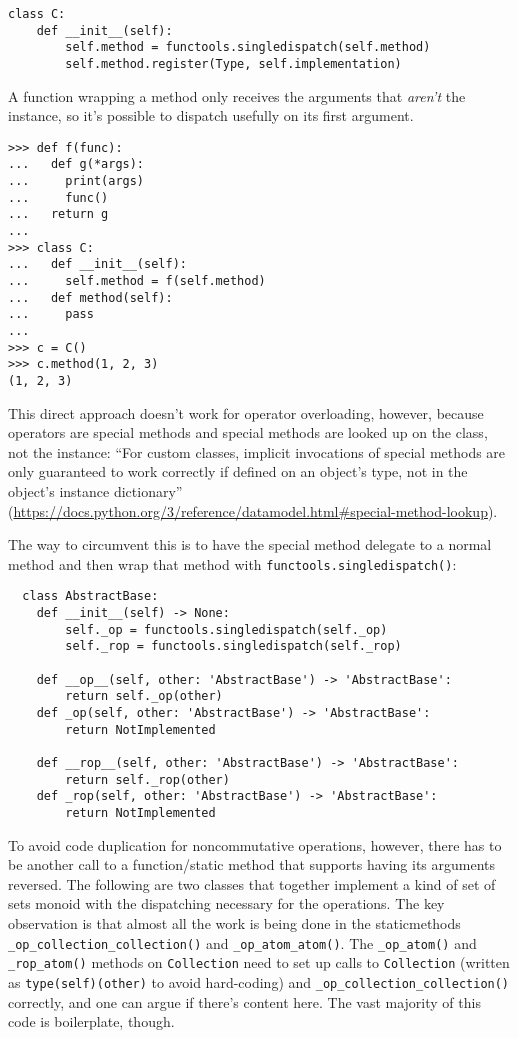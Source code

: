 \documentclass[12pt]{article}
\begin{document}
\begin{lstlisting}
class C:
    def __init__(self):
        self.method = functools.singledispatch(self.method)
        self.method.register(Type, self.implementation)
\end{lstlisting}

A function wrapping a method only receives the arguments that
\emph{aren't} the instance, so it's possible to dispatch usefully on
its first argument.

\begin{lstlisting}
>>> def f(func):
...   def g(*args):
...     print(args)
...     func()
...   return g
... 
>>> class C:
...   def __init__(self):
...     self.method = f(self.method)
...   def method(self):
...     pass
... 
>>> c = C()
>>> c.method(1, 2, 3)
(1, 2, 3)
\end{lstlisting}

This direct approach doesn't work for operator overloading, however,
because operators are special methods and special methods are looked
up on the class, not the instance: ``For custom classes, implicit
invocations of special methods are only guaranteed to work correctly
if defined on an object's type, not in the object's instance
dictionary''
(\url{https://docs.python.org/3/reference/datamodel.html#special-method-lookup}).

The way to circumvent this is to have the special method delegate to a
normal method and then wrap that method with
\texttt{functools.singledispatch()}:

\begin{lstlisting}
  class AbstractBase:
    def __init__(self) -> None:
        self._op = functools.singledispatch(self._op)
        self._rop = functools.singledispatch(self._rop)

    def __op__(self, other: 'AbstractBase') -> 'AbstractBase':
        return self._op(other)
    def _op(self, other: 'AbstractBase') -> 'AbstractBase':
        return NotImplemented

    def __rop__(self, other: 'AbstractBase') -> 'AbstractBase':
        return self._rop(other)
    def _rop(self, other: 'AbstractBase') -> 'AbstractBase':
        return NotImplemented
\end{lstlisting}

To avoid code duplication for noncommutative operations, however,
there has to be another call to a function/static method that supports
having its arguments reversed.  The following are two classes that
together implement a kind of set of sets monoid with the dispatching
necessary for the operations.  The key observation is that almost all
the work is being done in the staticmethods
\texttt{\_op\_collection\_collection()} and \texttt{\_op\_atom\_atom()}.
The \texttt{\_op\_atom()} and \texttt{\_rop\_atom()} methods on
\texttt{Collection} need to set up calls to \texttt{Collection}
(written as \texttt{type(self)(other)} to avoid hard-coding) and
\texttt{\_op\_collection\_collection()} correctly, and one can argue if
there's content here.  The vast majority of this code is boilerplate,
though.
\end{document}
